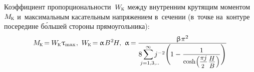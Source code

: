 \documentclass[14pt]{extarticle}
\begin{document}
Коэффициент пропорциональности~${W_{\hspace{-0.1ex}\mathrm{\scalebox{.6}{K}}}}$ между внутренним крутящим моментом~${M_{\hspace{-0.1ex}\mathrm{\scalebox{.6}{K}}}}$ и~максимальным касательным напряжением в~сечении (в~точке на~контуре посередине б\'{о}льшей стороны прямоугольника):
\[
M_{\hspace{-0.1ex}\mathrm{\scalebox{.6}{K}}} \hspace{-0.3ex}=\hspace{-0.1ex}
W_{\hspace{-0.1ex}\mathrm{\scalebox{.6}{K}}} \hspace{.1ex} \uptau_{\mathrm{max}}
\hspace{.1ex} , \hspace{.33em}
W_{\hspace{-0.1ex}\mathrm{\scalebox{.6}{K}}} \hspace{-0.3ex}=\hspace{-0.1ex}
\upalpha \hspace{.2ex} B^{\hspace{.1ex}2} \hspace{-0.2ex} H
, \hspace{.33em}
%
\upalpha \hspace{-0.2ex}=\hspace{-0.1ex}
\displaystyle\frac{\raisebox{-0.1em}{$\upbeta \hspace{.1ex} \pi^2$}}{8 \hspace{.4ex}
\scalebox{1}{$\displaystyle\sum_{\mathclap{\hspace{.4em}\scalebox{1}{$\scriptstyle j=1,3,..$}}}^{\raisebox{-0.1em}{\scalebox{.75}{$\infty$}}}$} \hspace{.3ex} j^{-2} \Biggl( \hspace{-.1ex} 1 - \displaystyle\frac{\raisebox{-0.1em}{\scalebox{.96}{$1$}}}{%
\scalebox{.93}{$
\operatorname{cosh} \hspace{-0.33ex} \left( \hspace{-0.1ex} \displaystyle\frac{\raisebox{-0.18em}{$\pi \hspace{-0.1ex} j$}}{\scalebox{.88}{$2$}} \hspace{.2ex} \displaystyle\frac{\raisebox{-0.2em}{$H$}}{B} \hspace{.1ex} \right)
$}} \Biggr)}
\]
\end{document}
